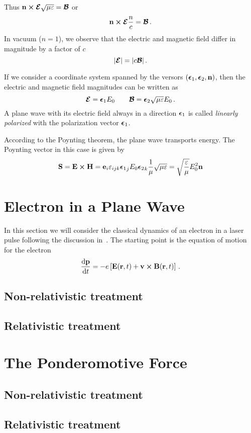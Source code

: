 \documentclass[12pt, class=report, crop=false]{standalone}
\begin{document}
Thus \(\vb{n} \cp \vb*{\mathcal{E}} \sqrt{\mu\varepsilon} = \vb*{\mathcal{B}}\) or
\[
\vb{n} \cp \vb*{\mathcal{E}} \frac{n}{c} = \vb*{\mathcal{B}}\,.
\]
In vacuum (\(n=1\)), we observe that the electric and magnetic field differ in magnitude by a factor of \(c\)
\[
\abs{\vb*{\mathcal{E}}} = \abs{c\vb*{\mathcal{B}}}\,.
\]

If we consider a coordinate system spanned by the versors
\((\vb*{\epsilon}_1,\vb*{\epsilon}_2,\vb{n})\), then the electric
and magnetic field magnitudes can be written as
\[
\vb*{\mathcal{E}} = \vb*{\epsilon}_1 E_0 \qquad
\vb*{\mathcal{B}} = \vb*{\epsilon}_2 \sqrt{\mu\varepsilon} E_0\,.
\]
A plane wave with its electric field always in a direction \(\vb*{\epsilon}_1\) is called \emph{linearly polarized} with the
polarization vector \(\vb*{\epsilon}_1\).

According to the Poynting theorem, the plane wave transports energy. The Poynting vector in this case is given by
\[
\vb{S} = \vb{E} \cp \vb{H} =
\vb{e}_i \varepsilon_{ijk} {\vb*{\epsilon}_1}_j E_0 {\vb*{\epsilon}_2}_k \frac{1}{\mu} \sqrt{\mu\varepsilon} =
\sqrt{\frac{\varepsilon}{\mu}} E_0^2\vb{n}
\]

\section{Electron in a Plane Wave}

In this section we will consider the classical dynamics of an electron in a
laser pulse following the discussion in~\textcite{karsch_applicationshigh_2018}.
The starting point is the equation of motion for the electron
\begin{equation}
  \label{eq:lorentz-eom}
  \dv{\vb{p}}{t} = -e \left[ \vb{E}(\vb{r}, t) + \vb{v} \cp \vb{B}(\vb{r}, t) \right]\,.
\end{equation}

\subsection{Non-relativistic treatment}

\subsection{Relativistic treatment}

\section{The Ponderomotive Force}

\subsection{Non-relativistic treatment}

\subsection{Relativistic treatment}
\end{document}
